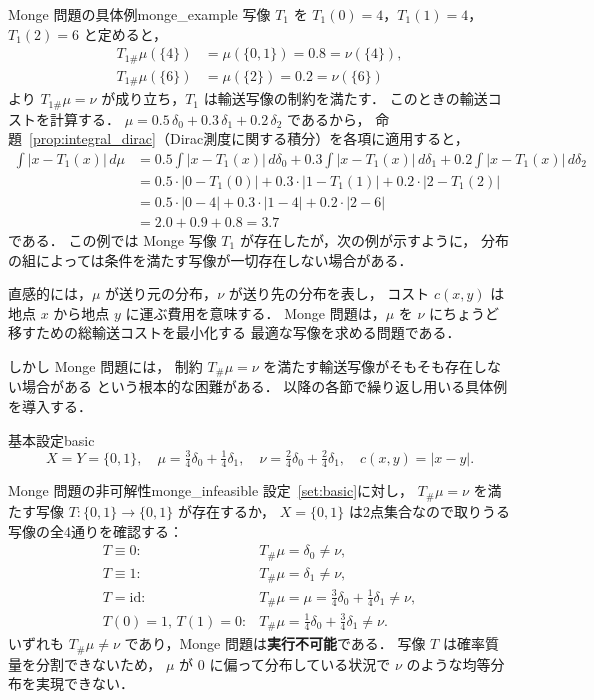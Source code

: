 \documentclass[uplatex, dvipdfmx]{jsarticle}
\begin{document}
\begin{example}{Monge 問題の具体例}{monge_example}
写像 $T_1$ を $T_1(0)=4$，$T_1(1)=4$，$T_1(2)=6$ と定めると，
\begin{align*}
  T_{1\#}\mu(\{4\}) &= \mu(\{0,1\}) = 0.8 = \nu(\{4\}), \\
  T_{1\#}\mu(\{6\}) &= \mu(\{2\}) = 0.2 = \nu(\{6\})
\end{align*}
より $T_{1\#}\mu=\nu$ が成り立ち，$T_1$ は輸送写像の制約を満たす．
このときの輸送コストを計算する．
$\mu = 0.5\,\delta_0 + 0.3\,\delta_1 + 0.2\,\delta_2$ であるから，
命題~\ref{prop:integral_dirac}（Dirac測度に関する積分）を各項に適用すると，
\begin{align*}
  \int |x-T_1(x)|\,d\mu
  &= 0.5\int|x-T_1(x)|\,d\delta_0
   + 0.3\int|x-T_1(x)|\,d\delta_1
   + 0.2\int|x-T_1(x)|\,d\delta_2 \\
  &= 0.5\cdot|0-T_1(0)| + 0.3\cdot|1-T_1(1)| + 0.2\cdot|2-T_1(2)| \\
  &= 0.5\cdot|0-4| + 0.3\cdot|1-4| + 0.2\cdot|2-6| \\
  &= 2.0 + 0.9 + 0.8 = 3.7
\end{align*}
である．
この例では Monge 写像 $T_1$ が存在したが，次の例が示すように，
分布の組によっては条件を満たす写像が一切存在しない場合がある．
\end{example}

直感的には，$\mu$ が送り元の分布，$\nu$ が送り先の分布を表し，
コスト $c(x,y)$ は地点 $x$ から地点 $y$ に運ぶ費用を意味する．
Monge 問題は，$\mu$ を $\nu$ にちょうど移すための総輸送コストを最小化する
最適な写像を求める問題である．

しかし Monge 問題には，
制約 $T_\#\mu=\nu$ を満たす輸送写像がそもそも存在しない場合がある
という根本的な困難がある．
以降の各節で繰り返し用いる具体例を導入する．

\begin{setting}{基本設定}{basic}
\[
  X=Y=\{0,1\},\quad
  \mu = \tfrac{3}{4}\delta_0 + \tfrac{1}{4}\delta_1,\quad
  \nu  = \tfrac{2}{4}\delta_0 + \tfrac{2}{4}\delta_1,\quad
  c(x,y) = |x-y|.
\]
\end{setting}

\begin{example}{Monge 問題の非可解性}{monge_infeasible}
設定~\ref{set:basic}に対し，
$T_\#\mu=\nu$ を満たす写像 $T:\{0,1\}\to\{0,1\}$ が存在するか，
$X=\{0,1\}$ は2点集合なので取りうる写像の全4通りを確認する：
\[
  \begin{array}{ll}
    T\equiv 0: & T_\#\mu = \delta_0 \ne \nu, \\[2pt]
    T\equiv 1: & T_\#\mu = \delta_1 \ne \nu, \\[2pt]
    T=\mathrm{id}: & T_\#\mu = \mu = \tfrac{3}{4}\delta_0+\tfrac{1}{4}\delta_1 \ne \nu, \\[2pt]
    T(0)=1,\,T(1)=0: & T_\#\mu = \tfrac{1}{4}\delta_0+\tfrac{3}{4}\delta_1 \ne \nu.
  \end{array}
\]
いずれも $T_\#\mu\ne\nu$ であり，Monge 問題は\textbf{実行不可能}である．
写像 $T$ は確率質量を分割できないため，
$\mu$ が $0$ に偏って分布している状況で $\nu$ のような均等分布を実現できない．
\end{example}
\end{document}
